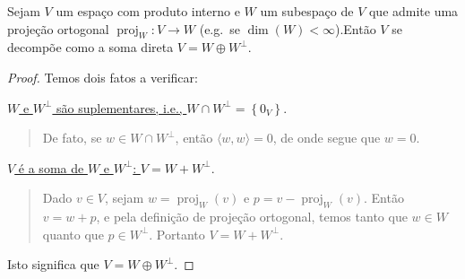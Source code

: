 \begin{theorem}
	Sejam $V$ um espaço com produto interno e $W$ um subespaço de $V$ que admite uma projeção ortogonal $\operatorname{proj}_W\colon V\to W$ (e.g.\ se $\dim(W)<\infty$).Então $V$ se decompõe como a soma direta $V=W\oplus W^\perp$.
\end{theorem}

\begin{proof}
	Temos dois fatos a verificar:
		
		\uline{$W$ e $W^\perp$ são suplementares, i.e., $W\cap W^\perp=\left\{0_V\right\}$}.
		\begin{quote}
			De fato, se $w\in W\cap W^\perp$, então $\langle w,w\rangle=0$, de onde segue que $w=0$.
		\end{quote}
	
		\uline{$V$ é a soma de $W$ e $W^\perp$: $V=W+W^\perp$}.
	
		\begin{quote}
			Dado $v\in V$, sejam $w=\operatorname{proj}_W(v)$ e $p=v-\operatorname{proj}_W(v)$. Então $v=w+p$, e pela definição de projeção ortogonal, temos tanto que $w\in W$ quanto que $p\in W^\perp$. Portanto $V=W+W^\perp$.
		\end{quote}
		
		Isto significa que $V=W\oplus W^\perp$.
\end{proof}